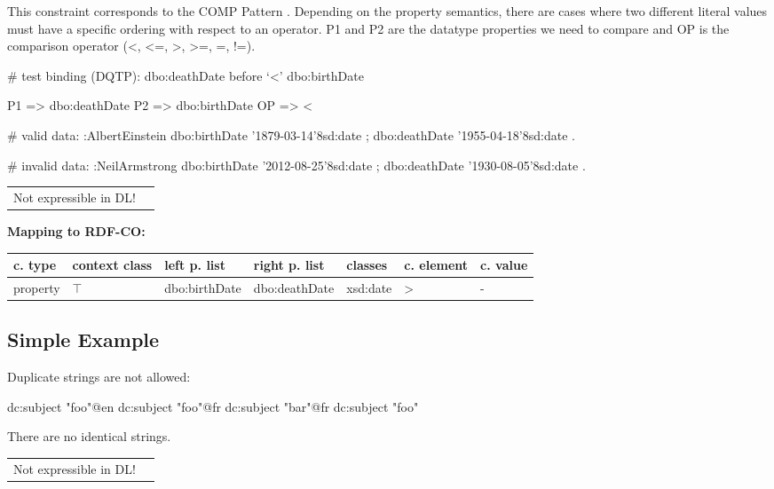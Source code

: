 \documentclass{llncs}
\newenvironment{gcotable}{
  \scriptsize
  \sffamily
  \vspace{0cm}
	\begin{center}
	\textbf{\vspace{0.4cm}Mapping to RDF-CO:} \\
  \begin{tabular}{l|l|l|l|l|l|l}
	\hline
  \textbf{c. type} & \textbf{context class} & \textbf{left p. list} & \textbf{right p. list} & \textbf{classes} & \textbf{c. element} & \textbf{c. value} \\
  \hline

}{
  \hline
  \end{tabular}
	\end{center}
}
\newenvironment{DL}{
  \vspace{0cm}
	\begin{center}
  \begin{tabular}{r l}

}{
  \end{tabular}
	\end{center}
}
\begin{document}

This constraint corresponds to the COMP Pattern \cite{Kontokostas2014}. 
Depending on the property semantics,
there are cases where two different literal values must have
a specific ordering with respect to an operator. 
P1 and P2 are the datatype properties we need to compare and 
OP is the comparison operator (\textless, \textless=, \textgreater, \textgreater=, =, !=). 

\begin{ex}
# test binding (DQTP):
dbo:deathDate before ‘<’ dbo:birthDate

P1 => dbo:deathDate
P2 => dbo:birthDate
OP => <
\end{ex}

\begin{ex}
# valid data:
:AlbertEinstein
    dbo:birthDate '1879-03-14'^^xsd:date ;
    dbo:deathDate '1955-04-18'^^xsd:date .
\end{ex}

\begin{ex}
# invalid data:
:NeilArmstrong
    dbo:birthDate '2012-08-25'^^xsd:date ;
    dbo:deathDate '1930-08-05'^^xsd:date .
\end{ex}

\begin{DL}
Not expressible in DL!
\end{DL}

\begin{gcotable}
property & $\top$ & dbo:birthDate & dbo:deathDate & xsd:date & \textgreater & - \\
\end{gcotable}

\subsection{Simple Example}

Duplicate strings are not allowed:

\begin{ex}
dc:subject "foo"@en
dc:subject "foo"@fr
dc:subject "bar"@fr
dc:subject "foo"
\end{ex}

There are no identical strings.

\begin{DL}
Not expressible in DL!
\end{DL}
\end{document}
